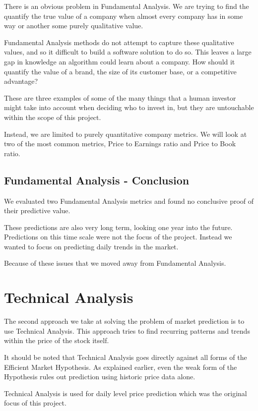 \documentclass{report}
\begin{document}
There is an obvious problem in Fundamental Analysis. We are trying to find the quantify the true value of a company when almost every company has in some way or another some purely qualitative value.

Fundamental Analysis methods do not attempt to capture these qualitative values, and so it difficult to build a software solution to do so. This leaves a large gap in knowledge an algorithm could learn about a company. How should it quantify the value of a brand, the size of its customer base, or a competitive advantage?

These are three examples of some of the many things that a human investor might take into account when deciding who to invest in, but they are untouchable within the scope of this project. 

Instead, we are limited to purely quantitative company metrics. We will look at two of the most common metrics, Price to Earnings ratio and Price to Book ratio.

\section{Fundamental Analysis - Conclusion}

We evaluated two Fundamental Analysis metrics and found no conclusive proof of their predictive value.  

These predictions are also very long term, looking one year into the future. Predictions on this time scale were not the focus of the project. Instead we wanted to focus on predicting daily trends in the market.

Because of these issues that we moved away from Fundamental Analysis.

\chapter{Technical Analysis}


The second approach we take at solving the problem of market prediction is to use Technical Analysis. This approach tries to find recurring patterns and trends within the price of the stock itself.

It should be noted that Technical Analysis goes directly against all forms of the Efficient Market Hypothesis. As explained earlier, even the weak form of the Hypothesis rules out prediction using historic price data alone.

Technical Analysis is used for daily level price prediction which was the original focus of this project. 
\end{document}
